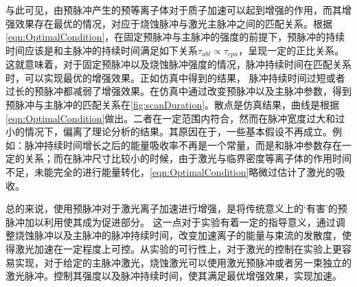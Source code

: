 与此可见，由预脉冲产生的预等离子体对于质子加速可以起到增强的作用，而其增强效果存在最优的情况，对应于烧蚀脉冲与激光主脉冲之间的匹配关系。根据\ref{eqn:OptimalCondition}，在固定预脉冲与主脉冲的强度的前提下，预脉冲的持续时间应该是和主脉冲的持续时间满足如下关系${\tau}_{abl} \propto  \tau_{cpa}$，呈现一定的正比关系。这就意味着，对于固定预脉冲以及烧蚀脉冲强度的情况，脉冲持续时间在匹配关系时，可以实现最优的增强效果。正如仿真中得到的结果， 脉冲持续时间过短或者过长的预脉冲都减弱了增强效果。在仿真中通过改变预脉冲以及主脉冲参数，得到预脉冲与主脉冲的匹配关系在\ref{fig:scanDuration}。散点是仿真结果，曲线是根据\ref{eqn:OptimalCondition}做出。二者在一定范围内符合，然而在脉冲宽度过大和过小的情况下，偏离了理论分析的结果。其原因在于，一些基本假设不再成立。例如：脉冲持续时间增长之后的能量吸收率不再是一个常量，而是和脉冲参数存在一定的关系；而在脉冲尺寸比较小的时候，由于激光与临界密度等离子体的作用时间不足，未能完全的进行能量转化，\ref{eqn:OptimalCondition}略微过估计了激光的吸收。




总的来说，使用预脉冲对于激光离子加速进行增强，是将传统意义上的‘有害’的预脉冲加以利用使其成为促进部分。  这一点对于实验有着一定的指导意义，通过调整烧蚀脉冲以及主脉冲的脉冲持续时间，改变加速离子的能量与束流的发散度，使得激光加速在一定程度上可控。从实验的可行性上，对于激光的控制在实验上更容易实现，对于给定的主脉冲激光，烧蚀激光可以使用激光预脉冲或者另一束独立的激光脉冲。控制其强度以及脉冲持续时间，使其满足最优增强效果，实现加速。




